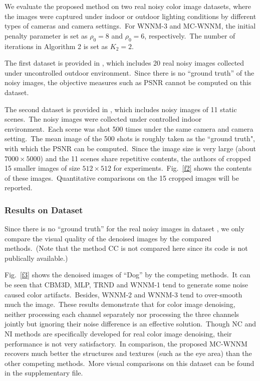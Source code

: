 \documentclass[10pt,twocolumn,letterpaper]{article}
\begin{document}
We evaluate the proposed method on two real noisy color image datasets, where the images were captured under indoor or outdoor lighting conditions by different types of cameras and camera settings.\ For WNNM-3 and MC-WNNM, the initial penalty parameter is set as $\rho_{0}=8$ and $\rho_{0}=6$, respectively.\ The number of iterations in Algorithm 2 is set as $K_{2}=2$.

The first dataset is provided in \cite{ncwebsite}, which includes 20 real noisy images collected under uncontrolled outdoor environment.\ Since there is no ``ground truth'' of the noisy images, the objective measures such as PSNR cannot be computed on this dataset.

The second dataset is provided in \cite{crosschannel2016}, which includes noisy images of 11 static scenes.\ The noisy images were collected under controlled indoor environment.\ Each scene was shot 500 times under the same camera and camera setting.\ The mean image of the 500 shots is roughly taken as the ``ground truth", with which the PSNR can be computed.\ Since the image size is very large (about $7000\times5000$) and the 11 scenes share repetitive contents, the authors of \cite{crosschannel2016} cropped 15 smaller images of size $512\times512$ for experiments.\ Fig.\ \ref{f2} shows the contents of these images.\ Quantitative comparisons on the 15 cropped images will be reported. 

\vspace{-2mm}
\subsubsection{Results on Dataset \cite{ncwebsite}}
\vspace{-2mm}

\quad Since there is no ``ground truth'' for the real noisy images in dataset \cite{ncwebsite}, we only compare the visual quality of the denoised images by the compared methods.\ (Note that the method CC \cite{crosschannel2016} is not compared here since its code is not publically available.)

Fig.\ \ref{f3} shows the denoised images of ``Dog'' by the competing methods.\ It can be seen that CBM3D, MLP, TRND and WNNM-1 tend to generate some noise caused color artifacts.\ Besides, WNNM-2 and WNNM-3 tend to over-smooth much the image.\ These results demonstrate that for color image denoising, neither processing each channel separately nor processing the three channels jointly but ignoring their noise difference is an effective solution.\ Though NC and NI methods are specifically developed for real color image denoising, their performance is not very satisfactory.\ In comparison, the proposed MC-WNNM recovers much better the structures and textures (such as the eye area) than the other competing methods.\ More visual comparisons on this dataset can be found in the supplementary file.
\end{document}
